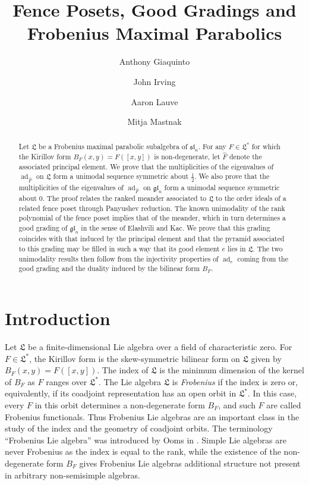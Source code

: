 \documentclass{amsart}
\title{Fence Posets, Good Gradings and Frobenius Maximal Parabolics}
\author{Anthony Giaquinto}
\author{John Irving}
\author{Aaron Lauve}
\author{Mitja Mastnak}
\def\sl{\mathfrak{sl}}
\def\gl{\mathfrak{gl}}
\def\L{\mathfrak L}
\def\sln{\sl_n}
\def\gln{\gl_n}
\def\ad{\operatorname{ad}}
\theoremstyle{definition}
\begin{document}
\begin{abstract}
Let $\L$ be a Frobenius maximal parabolic subalgebra of $\sln$. For any
$F\in\L^*$ for which the Kirillov form
$B_F(x,y)=F([x,y])$ is non-degenerate, let $\widehat F$ denote the
associated principal element. We prove that the multiplicities of the
eigenvalues of $\operatorname{ad}_{\widehat F}$ on $\L$ form a
unimodal sequence symmetric about $\frac12$. We also prove that the multiplicities of the
eigenvalues of $\operatorname{ad}_{\widehat F}$ on $\gln$ form a
unimodal sequence symmetric about $0$. The proof relates the ranked meander associated to $\L$ to the order ideals of a related fence poset through Panyushev reduction. The known unimodality of the rank polynomial of the fence poset implies that of the meander, which in turn determines a good grading of $\gln$ in the sense of Elashvili and Kac. We prove that this grading coincides with that induced by the principal element and that the pyramid associated to this grading may be filled in such a way that its good element $e$ lies in $\L$. The two unimodality results then follow from the injectivity properties of $\ad_e$ coming from the good grading and the duality induced by the bilinear form $B_F$.
\end{abstract}

\maketitle


\section{Introduction}
\label{sec:intro}
	Let $\L$ be a finite-dimensional Lie algebra over a field of characteristic zero. For $F\in \L^*$, the Kirillov form is the skew-symmetric bilinear form on $\L$ given by $B_F(x,y)=F([x,y])$. The index of $\L$ is the minimum dimension of the kernel of $B_F$ as $F$ ranges over $\L^*$. The Lie algebra $\L$ is \emph{Frobenius} if the index is zero or, equivalently, if its coadjoint representation has an open orbit in $\L^*$. In this case, every $F$ in this orbit determines a non-degenerate form $B_F$, and such $F$ are called Frobenius functionals. Thus Frobenius Lie algebras are an important class in the study of the index and the geometry of coadjoint orbits. The terminology ``Frobenius Lie algebra'' was introduced by Ooms in
	\cite{ooms1980frobenius}. Simple Lie algebras are never Frobenius as the index is equal to the rank, while the existence of the non-degenerate form $B_F$ gives Frobenius Lie algebras additional structure not present  in arbitrary non-semisimple algebras. 
	
\end{document}
